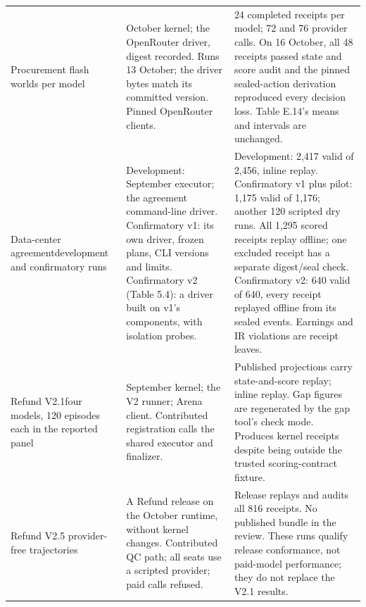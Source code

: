 \begin{longtable}{@{}P{1.28in}P{2.18in}P{3.0in}@{}}
\addlinespace[4pt]
Procurement flash worlds per model
& October kernel; the OpenRouter driver, digest recorded. Runs 13 October; the driver bytes match its committed version. Pinned OpenRouter clients.
& 24 completed receipts per model; 72 and 76 provider calls. On 16 October, all 48 receipts passed state and score audit and the pinned sealed-action derivation reproduced every decision loss. Table E.14's means and intervals are unchanged.\\
\addlinespace[4pt]
Data-center agreement\newline development and confirmatory runs
& Development: September executor; the agreement command-line driver. Confirmatory v1: its own driver, frozen plans, CLI versions and limits. Confirmatory v2 (Table 5.4): a driver built on v1's components, with isolation probes.
& Development: 2,417 valid of 2,456, inline replay. Confirmatory v1 plus pilot: 1,175 valid of 1,176; another 120 scripted dry runs. All 1,295 scored receipts replay offline; one excluded receipt has a separate digest/seal check. Confirmatory v2: 640 valid of 640, every receipt replayed offline from its sealed events. Earnings and IR violations are receipt leaves.\\
\addlinespace[4pt]
Refund V2.1\newline four models, 120 episodes each in the reported panel
& September kernel; the V2 runner; Arena client. Contributed registration calls the shared executor and finalizer.
& Published projections carry state-and-score replay; inline replay. Gap figures are regenerated by the gap tool's check mode. Produces kernel receipts despite being outside the trusted scoring-contract fixture.\\
\addlinespace[4pt]
Refund V2.5 provider-free trajectories
& A Refund release on the October runtime, without kernel changes. Contributed QC path; all seats use a scripted provider; paid calls refused.
& Release replays and audits all 816 receipts. No published bundle in the review. These runs qualify release conformance, not paid-model performance; they do not replace the V2.1 results.\\
\end{longtable}
\endgroup

